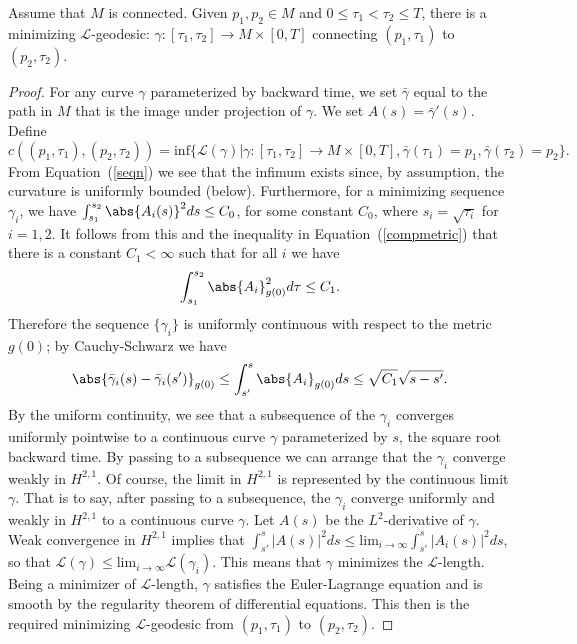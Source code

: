 \begin{lemma}
\label{lem:l-geodesic-existence}
\label{geoexist} Assume that $M$ is connected.
Given $p_1,p_2\in M$ and $0\le\tau_1<\tau_2\le T$, there is
 a minimizing ${\mathcal L}$-geodesic:
$\gamma\colon[\tau_{1},\tau_{2}]\to M\times [0,T]$ connecting
$(p_1,\tau_1)$ to $(p_2,\tau_2)$.
\end{lemma}

\begin{proof}\sketch For any curve $\gamma$ parameterized by backward time, we set
$\bar \gamma$ equal to the path in $M$ that is the image under
projection of $\gamma$. We set $A(s)=\bar\gamma'(s)$. Define
$$c((p_1,\tau_1),(p_2,\tau_{2})) = \mathrm{inf}
\{\mathcal{L}(\gamma)|\gamma\colon [\tau_{1},\tau_{2}] \rightarrow
M\times [0,T], \bar\gamma(\tau_{1}) = p_1, \bar\gamma(\tau_{2})=
p_2\}.$$ From Equation~(\ref{seqn}) we see that the infimum exists
since, by assumption, the curvature is uniformly bounded (below).
Furthermore, for a minimizing sequence $\gamma_{i}$, we have
$\int_{s_1}^{s_{2}}\abs{A_i(s)}^{2}ds \leq C_0$, for some constant
$C_0$, where $s_i=\sqrt{\tau_i}$ for $i=1,2$. It follows from this
and the inequality in Equation~(\ref{compmetric}) that there is a
constant $C_1<\infty$ such that for all $i$ we have
$$\int_{s_{1}}^{s_{2}} \abs{
A_{i}}^{2}_{g(0)}d\tau \leq C_1.$$ Therefore the sequence $\{\gamma_{i}\}$ is
uniformly continuous with respect to the metric $g(0)$; by Cauchy-Schwarz we
have
$$\abs{\bar\gamma_{i}(s) - \bar\gamma_{i}(s')}_{g(0)} \leq
\int_{s'}^{s} \abs{A_{i}}_{g(0)}ds \leq \sqrt{C_1}\sqrt{s-s'}.$$ By
the uniform continuity, we see that a subsequence of the $\gamma_i$
converges uniformly pointwise to a continuous curve $\gamma$
parameterized by $s$, the square root backward time. By passing to a
subsequence we can arrange that the $\gamma_i$ converge weakly in
$H^{2,1}$. Of course, the limit in $H^{2,1}$ is represented by the
continuous limit $\gamma$. That is to say, after passing to a
subsequence, the $\gamma_i$ converge uniformly and weakly in
$H^{2,1}$ to a continuous curve $\gamma$. Let $A(s)$ be the
$L^2$-derivative of $\gamma$. Weak convergence in $H^{2,1}$ implies
that $\int_{s'}^s|A(s)|^2ds\le \mathrm{lim}_{i\rightarrow\infty}\int_{s'}^s|A_i(s)|^2ds$, so that
${\mathcal L}(\gamma)\le \mathrm{lim}_{i\rightarrow\infty}{\mathcal
L}(\gamma_i)$. This means that $\gamma$ minimizes the ${\mathcal
L}$-length. Being a minimizer of ${\mathcal L}$-length, $\gamma$
satisfies the Euler-Lagrange equation and is smooth by the
regularity theorem of differential equations. This then is the
required minimizing ${\mathcal L}$-geodesic from $(p_1,\tau_1)$ to
$(p_2,\tau_2)$.
\end{proof}



